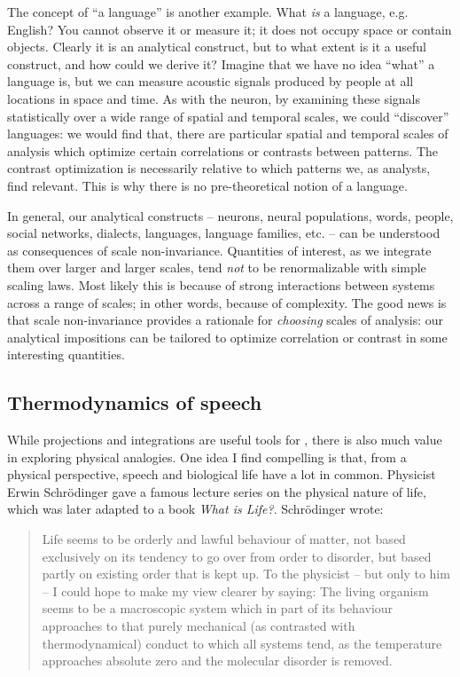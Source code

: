   The concept of “a language” is another example. What \textit{is} a language, e.g. English? You cannot observe it or measure it; it does not occupy space or contain objects. Clearly it is an analytical construct, but to what extent is it a useful construct, and how could we derive it? Imagine that we have no idea “what” a language is, but we can measure acoustic signals produced by people at all locations in space and time. As with the neuron, by examining these signals statistically over a wide range of spatial and temporal scales, we could “discover” languages: we would find that, there are particular spatial and temporal scales of analysis which optimize certain correlations or contrasts between patterns. The contrast optimization is necessarily relative to which patterns we, as analysts, find relevant. This is why there is no pre-theoretical notion of a language.

  In general, our analytical constructs -- neurons, neural populations, words, people, social networks, dialects, languages, language families, etc. -- can be understood as consequences of scale non-invariance. Quantities of interest, as we integrate them over larger and larger scales, tend \textit{not} to be renormalizable with simple scaling laws. Most likely this is because of strong interactions between systems across a range of scales; in other words, because of complexity. The good news is that scale non-invariance provides a rationale for \textit{choosing} scales of analysis: our analytical impositions can be tailored to optimize correlation or contrast in some interesting quantities.

\subsection{Thermodynamics of speech}

While projections and integrations are useful tools for , there is also much value in exploring physical analogies. One idea I find compelling is that, from a physical perspective, speech and biological life have a lot in common. Physicist Erwin Schrödinger gave a famous lecture series on the physical nature of life, which was later adapted to a book \textit{What is Life?}. Schrödinger wrote:

\begin{quote}
Life seems to be orderly and lawful behaviour of matter, not based exclusively on its tendency to go over from order to disorder, but based partly on existing order that is kept up. To the physicist -- but only to him -- I could hope to make my view clearer by saying: The living organism seems to be a macroscopic system which in part of its behaviour approaches to that purely mechanical (as contrasted with thermodynamical) conduct to which all systems tend, as the temperature approaches absolute zero and the molecular disorder is removed. \citep{Schrödinger1944}
\end{quote}

